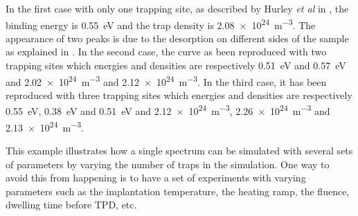 In the first case with only one trapping site, as described by Hurley \textit{et al} in , the binding energy is \SI{0.55}{eV} and the trap density is \SI{2.08e24}{m^{-3}}.
The appearance of two peaks is due to the desorption on different sides of the sample as explained in \cite{hurley_numerical_2015}.
In the second case, the curve as been reproduced with two trapping sites which energies and densities are respectively \SI{0.51}{eV} and \SI{0.57}{eV} and \SI{2.02e24}{m^{-3}} and \SI{2.12e24}{m^{-3}}.
In the third case, it has been reproduced with three trapping sites which energies and densities are respectively \SI{0.55}{eV}, \SI{0.38}{eV} and \SI{0.51}{eV} and \SI{2.12e24}{m^{-3}}, \SI{2.26e24}{m^{-3}} and \newline \SI{2.13e24}{m^{-3}}.

This example illustrates how a single spectrum can be simulated with several sets of parameters by varying the number of traps in the simulation.
One way to avoid this from happening is to have a set of experiments with varying parameters such as the implantation temperature, the heating ramp, the fluence, dwelling time before TPD, etc.
